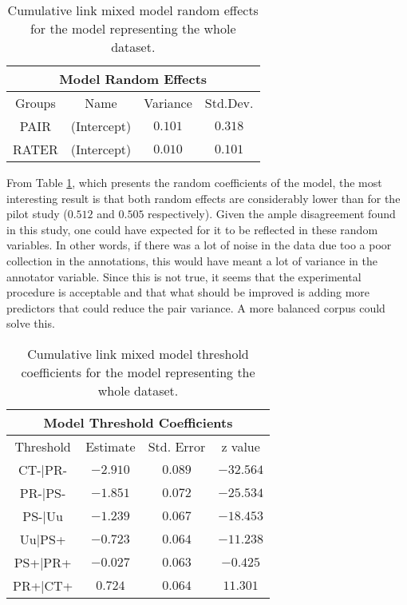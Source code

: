 \begin{table}
\center
\begin{tabular}{|c|c|c|c|}
\hline
\multicolumn{4}{|c|}{Model Random Effects}\\\hline
Groups  &  Name       &  Variance & Std.Dev.\\\hline
 PAIR  & (Intercept) & $0.101$ &$0.318$\\\hline  
 RATER & (Intercept) & $0.010$ &$0.101$\\\hline  
\end{tabular}
\caption[Model Random Effects.]{Cumulative link mixed model random effects for the model representing the whole dataset.}
\label{tab:modrand}
\end{table}

From Table \ref{tab:modrand}, which presents the random coefficients of the model, the most interesting result is that both random effects are considerably lower than for the pilot study ($0.512$ and $0.505$ respectively). Given the ample disagreement found in this study, one could have expected for it to be reflected in these random variables. In other words, if there was a lot of noise in the data due too a poor collection in the annotations, this would have meant a lot of variance in the annotator variable. Since this is not true, it seems that the experimental procedure is acceptable and that what should be improved is adding more predictors that could reduce the pair variance. A more balanced corpus could solve this.\\ 

\begin{table}
\center
\begin{tabular}{|c|c|c|c|}
\hline
\multicolumn{4}{|c|}{Model Threshold Coefficients}\\\hline
Threshold &  Estimate & Std. Error & z value\\\hline
CT-|PR- &$-2.910$ &$0.089$ &$-32.564$\\\hline
PR-|PS- &$-1.851$ &$0.072$ &$-25.534$\\\hline
PS-|Uu  &$-1.239$ &$0.067$ &$-18.453$\\\hline
Uu|PS+  &$-0.723$ &$0.064$ &$-11.238$\\\hline
PS+|PR+ &$-0.027$ &$0.063$ &$ -0.425$\\\hline
PR+|CT+ &$ 0.724$ &$0.064$ &$ 11.301$\\\hline
\end{tabular}
\caption[Model Threshold Coefficients.]{Cumulative link mixed model threshold coefficients for the model representing the whole dataset.}
\label{tab:modthres}
\end{table}

